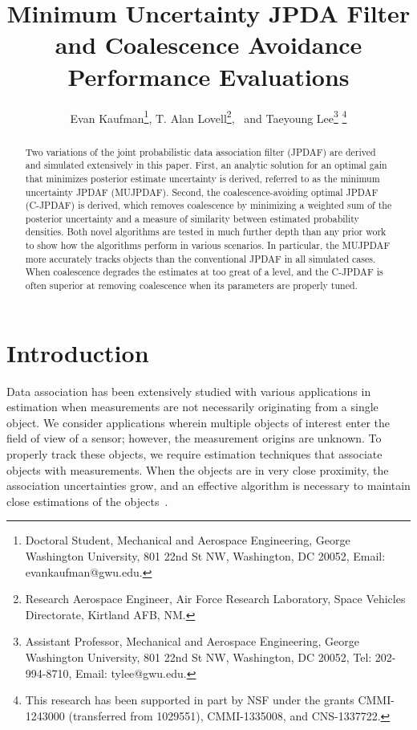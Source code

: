 \documentclass[letterpaper, paper,10pt]{AAS}		%
\begin{document}
\title{Minimum Uncertainty JPDA Filter and Coalescence Avoidance Performance Evaluations}

\author{Evan Kaufman\thanks{Doctoral Student, Mechanical and Aerospace Engineering, George Washington University, 801 22nd St NW, Washington, DC 20052, Email: evankaufman@gwu.edu.},  
T. Alan Lovell\thanks{Research Aerospace Engineer, Air Force Research Laboratory, Space Vehicles Directorate, Kirtland AFB, NM.},
\ and Taeyoung Lee\thanks{Assistant Professor, Mechanical and Aerospace Engineering, George Washington University, 801 22nd St NW, Washington, DC 20052, Tel: 202-994-8710, Email: tylee@gwu.edu.}
\thanks{This research has been supported in part by NSF under the grants CMMI-1243000 (transferred from 1029551), CMMI-1335008, and CNS-1337722.}
}


\maketitle{} 		


\begin{abstract}
Two variations of the joint probabilistic data association filter (JPDAF) are derived and simulated extensively in this paper.
First, an analytic solution for an optimal gain that minimizes posterior estimate uncertainty is derived, referred to as the minimum uncertainty JPDAF (MUJPDAF).
Second, the coalescence-avoiding optimal JPDAF (C-JPDAF) is derived, which removes coalescence by minimizing a weighted sum of the posterior uncertainty and a measure of similarity between estimated probability densities.
Both novel algorithms are tested in much further depth than any prior work to show how the algorithms perform in various scenarios.
In particular, the MUJPDAF more accurately tracks objects than the conventional JPDAF in all simulated cases.
When coalescence degrades the estimates at too great of a level, and the C-JPDAF is often superior at removing coalescence when its parameters are properly tuned.
\end{abstract}


\section{Introduction}

Data association has been extensively studied with various applications in estimation when measurements are not necessarily originating from a single object.
We consider applications wherein multiple objects of interest enter the field of view of a sensor; however, the measurement origins are unknown.
To properly track these objects, we require estimation techniques that associate objects with measurements.
When the objects are in very close proximity, the association uncertainties grow, and an effective algorithm is necessary to maintain close estimations of the objects~\cite{KauLovLee14}.
\end{document}
